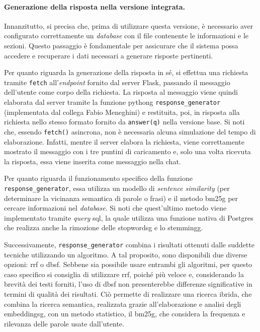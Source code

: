 \paragraph{Generazione della risposta nella versione integrata.} Innanzitutto, si precisa che, prima di utilizzare questa versione, è necessario aver configurato correttamente un \emph{database} con il file contenente le informazioni e 
le sezioni. Questo passaggio è fondamentale per assicurare che il sistema possa accedere e recuperare i dati necessari a generare risposte pertinenti.

Per quanto riguarda la generazione della risposta in sé, si effettua una richiesta tramite \texttt{fetch} all'\emph{endpoint} fornito dal server Flask, passando il messaggio dell'utente come corpo della richiesta. 
La risposta al messaggio viene quindi elaborata dal server tramite la funzione \gls{pythong} \texttt{response\_generator} (implementata dal collega Fabio Meneghini) e restituita, poi, in risposta alla richiesta 
nello stesso formato fornito da \texttt{answer(q)} nella versione base.
Si noti che, essendo \texttt{fetch()} asincrona, non è necessaria alcuna simulazione del tempo di elaborazione. Infatti, mentre il server elabora la richiesta, viene correttamente 
mostrato il messaggio con i tre puntini di caricamento e, solo una volta ricevuta la risposta, essa viene inserita come messaggio nella chat.

Per quanto riguarda il funzionamento specifico della funzione \texttt{response\_generator}, essa utilizza un modello di \emph{sentence similarity} (per determinare la vicinanza semantica di parole o frasi) e il metodo \gls{bm25g} per cercare informazioni 
nel \emph{database}. 
Si noti che quest'ultimo metodo viene implementato tramite \emph{query} \gls{sql}, la quale utilizza una funzione nativa di Postgres che realizza anche la rimozione delle \gls{stopwordsg} e lo \gls{stemmingg}.

Successivamente, \texttt{response\_generator} combina i risultati ottenuti dalle suddette tecniche utilizzando un algoritmo. A tal proposito, sono disponibili due diverse opzioni: \gls{rrf} o \gls{dbsf}.
Sebbene sia possibile usare entrambi gli algoritmi, per questo caso specifico si consiglia di utilizzare \gls{rrf}, poiché più veloce e, considerando la brevità dei testi forniti, 
l'uso di \gls{dbsf} non presenterebbe differenze significative in termini di qualità dei risultati.
Ciò permette di realizzare una ricerca ibrida, che combina la ricerca semantica, realizzata grazie all'elaborazione e analisi degli \gls{embeddingsg}, con un metodo statistico, il \gls{bm25g}, che considera la frequenza e 
rilevanza delle parole usate dall'utente.   


